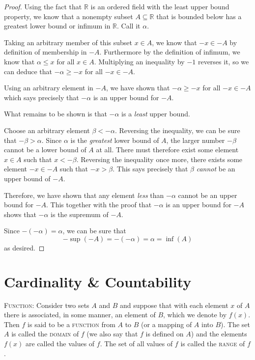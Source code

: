 \begin{proof}
Using the fact that $\mathbb{R}$ is an ordered field with the least upper bound property, we know that a nonempty subset $A \subseteq \mathbb{R}$ that is bounded below has a greatest lower bound or infimum in $\mathbb{R}$.  Call it $\alpha$.

Taking an arbitrary member of this subset $x \in A$, we know that $-x \in -A$ by definition of membership in $-A$.  Furthermore by the definition of infimum, we know that $\alpha \leq x$ for all $x\in A$.  Multiplying an inequality by $-1$ reverses it, so we can deduce that $-\alpha \geq -x$ for all $-x \in -A$.

Using an arbitrary element in $-A$, we have shown that $-\alpha \geq -x$ for all $-x \in -A$ which says precisely that $-\alpha$ is an upper bound for $-A$.  

What remains to be shown is that $-\alpha$ is a \emph{least} upper bound.  

Choose an arbitrary element $\beta < -\alpha$.  Reversing the inequality, we can be sure that $-\beta > \alpha$.  Since $\alpha$ is the \emph{greatest} lower bound of $A$, the larger number $-\beta$ cannot be a lower bound of $A$ at all.  There must therefore exist some element $x \in A$ such that  $x < -\beta$.  Reversing the inequality once more, there exists some element $-x \in -A$ such that $-x > \beta$.  This says precisely that $\beta$ \emph{cannot} be an upper bound of $-A$.

Therefore, we have shown that any element \emph{less} than $-\alpha$ cannot be an upper bound for $-A$.  This together with the proof that $-\alpha$ is an upper bound for $-A$ shows that $-\alpha$ is the supremum of $-A$.


Since $-(-\alpha) = \alpha$, we can be sure that 
$$ -\sup(-A) = -(-\alpha) = \alpha =  \inf(A) $$
as desired.
\end{proof}



\section{Cardinality \& Countability}
\begin{definition}\textsc{Function:}  Consider two sets $A$ and $B$ and suppose that with each element $x$ of $A$ there is associated, in some manner, an element of $B$, which we denote by $f(x)$.  Then $f$ is said to be a \textsc{function} from $A$ to $B$ (or a mapping of $A$ into $B$).  The set $A$ is called the \textsc{domain} of $f$  (we also say that $f$ is defined on $A$) and the elements $f(x)$ are called the values of $f$. The set of all values of $f$ is called the \textsc{range} of $f$.\end{definition}
\bigskip

